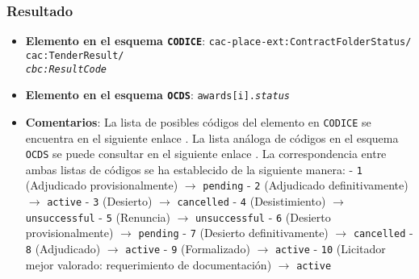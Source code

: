         \subsubsection{Resultado}
            \begin{itemize}
                \item \textbf{Elemento en el esquema \texttt{CODICE}}:
                    \tabto{7.6cm} \texttt{cac-place-ext:ContractFolderStatus/} \\
                    \tabto{7.6cm} \texttt{cac:TenderResult/} \\
                    \tabto{7.6cm} \texttt{\textit{cbc:ResultCode}}
                \item \textbf{Elemento en el esquema \texttt{OCDS}}:
                    \tabto{7.6cm} \texttt{awards[i].\textit{status}}
                \item \textbf{Comentarios}: La lista de posibles códigos del elemento en \texttt{CODICE} se encuentra en el siguiente enlace \cite{CR16}.
                    La lista análoga de códigos en el esquema \texttt{OCDS} se puede consultar en el siguiente enlace \cite{CR17}.
                    La correspondencia entre ambas listas de códigos se ha establecido de la siguiente manera:
                        \subitem - \texttt{1} (Adjudicado provisionalmente) $\rightarrow$ \texttt{pending}
                        \subitem - \texttt{2} (Adjudicado definitivamente) $\rightarrow$ \texttt{active}
                        \subitem - \texttt{3} (Desierto) $\rightarrow$ \texttt{cancelled}
                        \subitem - \texttt{4} (Desistimiento) $\rightarrow$ \texttt{unsuccessful}
                        \subitem - \texttt{5} (Renuncia) $\rightarrow$ \texttt{unsuccessful}
                        \subitem - \texttt{6} (Desierto provisionalmente) $\rightarrow$ \texttt{pending}
                        \subitem - \texttt{7} (Desierto definitivamente) $\rightarrow$ \texttt{cancelled}
                        \subitem - \texttt{8} (Adjudicado) $\rightarrow$ \texttt{active}
                        \subitem - \texttt{9} (Formalizado) $\rightarrow$ \texttt{active}
                        \subitem - \texttt{10} (Licitador mejor valorado: requerimiento de documentación) $\rightarrow$ \texttt{active}
            \end{itemize}
            
